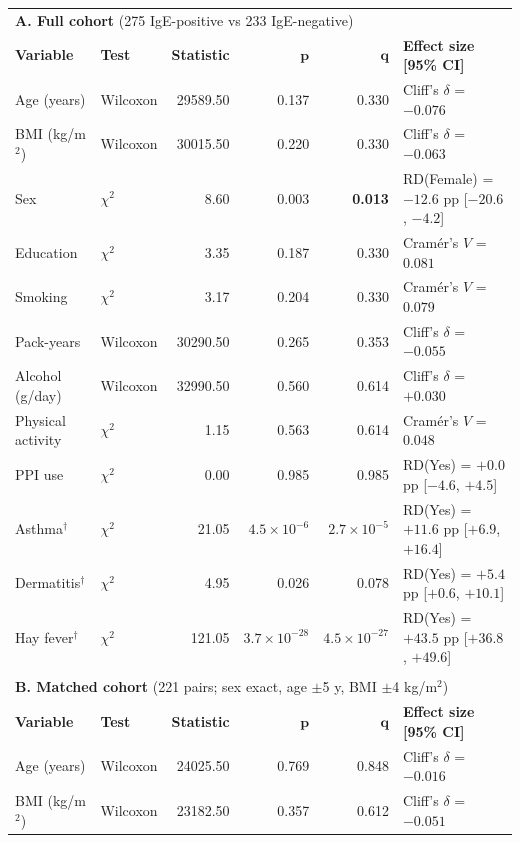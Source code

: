 \begin{table}[h!]
\centering
\footnotesize
\setlength{\tabcolsep}{4pt}
\begin{tabular}{l l r r r l}
\multicolumn{6}{l}{\textbf{A. Full cohort} (275 IgE-positive vs 233 IgE-negative)} \\
\textbf{Variable} & \textbf{Test} & \textbf{Statistic} & $\boldsymbol{p}$ & $\boldsymbol{q}$ & \textbf{Effect size [95\% CI]} \\
\hline
Age (years) & Wilcoxon & 29589.50 & 0.137 & 0.330 & Cliff's $\delta$ = $-0.076$ \\
BMI (kg/m$^2$) & Wilcoxon & 30015.50 & 0.220 & 0.330 & Cliff's $\delta$ = $-0.063$ \\
Sex & $\chi^2$ & 8.60 & 0.003 & \textbf{0.013} & RD(Female) = $-12.6$ pp [$-20.6$, $-4.2$] \\
Education & $\chi^2$ & 3.35 & 0.187 & 0.330 & Cram\'er's $V$ = $0.081$ \\
Smoking & $\chi^2$ & 3.17 & 0.204 & 0.330 & Cram\'er's $V$ = $0.079$ \\
Pack-years & Wilcoxon & 30290.50 & 0.265 & 0.353 & Cliff's $\delta$ = $-0.055$ \\
Alcohol (g/day) & Wilcoxon & 32990.50 & 0.560 & 0.614 & Cliff's $\delta$ = $+0.030$ \\
Physical activity & $\chi^2$ & 1.15 & 0.563 & 0.614 & Cram\'er's $V$ = $0.048$ \\
PPI use & $\chi^2$ & 0.00 & 0.985 & 0.985 & RD(Yes) = $+0.0$ pp [$-4.6$, $+4.5$] \\
Asthma$^{\dagger}$ & $\chi^2$ & 21.05 & $4.5\times10^{-6}$ & \textbf{$2.7\times10^{-5}$} & RD(Yes) = $+11.6$ pp [$+6.9$, $+16.4$] \\
Dermatitis$^{\dagger}$ & $\chi^2$ & 4.95 & 0.026 & 0.078 & RD(Yes) = $+5.4$ pp [$+0.6$, $+10.1$] \\
Hay fever$^{\dagger}$ & $\chi^2$ & 121.05 & $3.7\times10^{-28}$ & \textbf{$4.5\times10^{-27}$} & RD(Yes) = $+43.5$ pp [$+36.8$, $+49.6$] \\
\hline
\\
\multicolumn{6}{l}{\textbf{B. Matched cohort} (221 pairs; sex exact, age $\pm$5 y, BMI $\pm$4 kg/m$^2$)} \\
\textbf{Variable} & \textbf{Test} & \textbf{Statistic} & $\boldsymbol{p}$ & $\boldsymbol{q}$ & \textbf{Effect size [95\% CI]} \\
\hline
Age (years) & Wilcoxon & 24025.50 & 0.769 & 0.848 & Cliff's $\delta$ = $-0.016$ \\
BMI (kg/m$^2$) & Wilcoxon & 23182.50 & 0.357 & 0.612 & Cliff's $\delta$ = $-0.051$ \\

\end{tabular}
\end{table}
